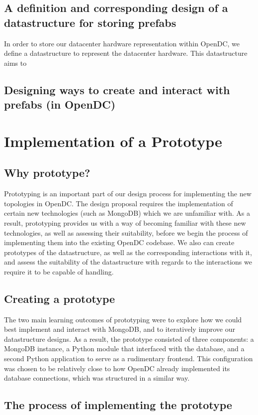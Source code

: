 \documentclass[11pt]{article}
\begin{document}
	\subsection{A definition and corresponding design of a datastructure for storing prefabs}
		In order to store our datacenter hardware representation within OpenDC, we define a datastructure to represent the datacenter hardware. 
		This datastructure aims to 
	\subsection{Designing ways to create and interact with prefabs (in OpenDC)}

\section{Implementation of a Prototype}

	\subsection{Why prototype?}
		Prototyping is an important part of our design process for implementing the new topologies in OpenDC.
		The design proposal requires the implementation of certain new technologies (such as MongoDB) which we are unfamiliar with.
		As a result, prototyping provides us with a way of becoming familiar with these new technologies, as well as assessing their suitability, before we begin the process of implementing them into the existing OpenDC codebase.
		We also can create prototypes of the datastructure, as well as the corresponding interactions with it, and assess the suitability of the datastructure with regards to the interactions we require it to be capable of handling.
	\subsection{Creating a prototype}
		The two main learning outcomes of prototyping were to explore how we could best implement and interact with MongoDB, and to iteratively improve our datastructure designs.
		As a result, the prototype consisted of three components: a MongoDB instance, a Python module that interfaced with the database, and a second Python application to serve as a rudimentary frontend. 
		This configuration was chosen to be relatively close to how OpenDC already implemented its database connections, which was structured in a similar way. 
	\subsection{The process of implementing the prototype}
\end{document}
